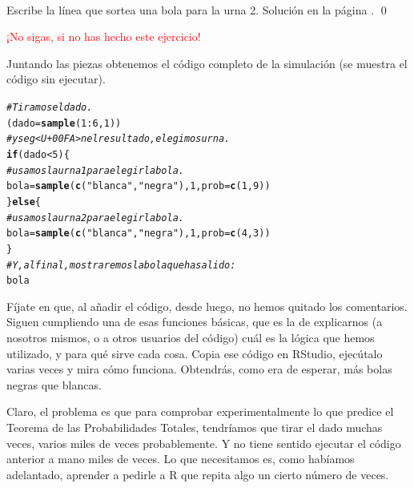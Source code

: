 \documentclass[10pt,a4paper]{article}\usepackage[]{graphicx}\usepackage[]{color}
\makeatletter
\newcommand{\hlnum}[1]{\textcolor[rgb]{0.686,0.059,0.569}{#1}}%
\newcommand{\hlstr}[1]{\textcolor[rgb]{0.192,0.494,0.8}{#1}}%
\newcommand{\hlcom}[1]{\textcolor[rgb]{0.678,0.584,0.686}{\textit{#1}}}%
\newcommand{\hlopt}[1]{\textcolor[rgb]{0,0,0}{#1}}%
\newcommand{\hlstd}[1]{\textcolor[rgb]{0.345,0.345,0.345}{#1}}%
\newcommand{\hlkwa}[1]{\textcolor[rgb]{0.161,0.373,0.58}{\textbf{#1}}}%
\newcommand{\hlkwb}[1]{\textcolor[rgb]{0.69,0.353,0.396}{#1}}%
\newcommand{\hlkwc}[1]{\textcolor[rgb]{0.333,0.667,0.333}{#1}}%
\newcommand{\hlkwd}[1]{\textcolor[rgb]{0.737,0.353,0.396}{\textbf{#1}}}%
\newenvironment{kframe}{%
 \def\at@end@of@kframe{}%
 \ifinner\ifhmode%
  \def\at@end@of@kframe{\end{minipage}}%
  \begin{minipage}{\columnwidth}%
 \fi\fi%
 \def\FrameCommand##1{\hskip\@totalleftmargin \hskip-\fboxsep
 \colorbox{shadecolor}{##1}\hskip-\fboxsep
     \hskip-\linewidth \hskip-\@totalleftmargin \hskip\columnwidth}%
 \MakeFramed {\advance\hsize-\width
   \@totalleftmargin\z@ \linewidth\hsize
   \@setminipage}}%
 {\par\unskip\endMakeFramed%
 \at@end@of@kframe}
\newenvironment{knitrout}{}{} %
\makeatother
\begin{document}
\begin{ejercicio}
\label{tut04:ejercicio08}
\quad\\
Escribe la línea que sortea una bola para la urna 2.
Solución en la página \pageref{tut04:ejercicio08:sol}.
\qed
\end{ejercicio}

\vspace{3cm}

\textcolor{red}{\Huge ¡No sigas, si no has hecho este ejercicio!}

\newpage
Juntando las piezas obtenemos el código completo de la simulación (se muestra el código sin ejecutar).

\begin{knitrout}
\color{fgcolor}\begin{kframe}
\begin{alltt}
\hlcom{# Tiramos el dado.}
\hlstd{(dado} \hlkwb{=} \hlkwd{sample}\hlstd{(}\hlnum{1}\hlopt{:}\hlnum{6}\hlstd{,}\hlnum{1}\hlstd{))}
\hlcom{# y seg<U+00FA>n el resultado, elegimos urna.}
\hlkwa{if}\hlstd{(dado} \hlopt{<} \hlnum{5}\hlstd{)\{}
  \hlcom{# usamos la urna 1 para elegir la bola.}
  \hlstd{bola} \hlkwb{=} \hlkwd{sample}\hlstd{(} \hlkwd{c}\hlstd{(}\hlstr{"blanca"}\hlstd{,}\hlstr{"negra"}\hlstd{),} \hlnum{1}\hlstd{,} \hlkwc{prob}\hlstd{=}\hlkwd{c}\hlstd{(}\hlnum{1}\hlstd{,}\hlnum{9}\hlstd{) )}
\hlstd{\}} \hlkwa{else} \hlstd{\{}
  \hlcom{# usamos la urna 2 para elegir la bola.}
  \hlstd{bola} \hlkwb{=} \hlkwd{sample}\hlstd{(} \hlkwd{c}\hlstd{(}\hlstr{"blanca"}\hlstd{,}\hlstr{"negra"}\hlstd{),} \hlnum{1}\hlstd{,} \hlkwc{prob}\hlstd{=}\hlkwd{c}\hlstd{(}\hlnum{4}\hlstd{,}\hlnum{3}\hlstd{) )}
\hlstd{\}}
\hlcom{# Y, al final, mostraremos la bola que ha salido:}
\hlstd{bola}
\end{alltt}
\end{kframe}
\end{knitrout}

Fíjate en que, al añadir el código, desde luego, no hemos quitado los comentarios. Siguen cumpliendo una de esas funciones básicas, que es la de explicarnos (a nosotros mismos, o a otros usuarios del código) cuál es la lógica que hemos utilizado, y para qué sirve cada cosa. Copia ese código en RStudio, ejecútalo varias veces y mira cómo funciona. Obtendrás, como era de esperar, más bolas negras que blancas.

Claro, el problema es que para comprobar experimentalmente lo que predice el Teorema de las Probabilidades Totales, tendríamos que tirar el dado muchas veces, varios miles de veces probablemente. Y no tiene sentido ejecutar el código anterior a mano miles de veces. Lo que necesitamos es, como habíamos adelantado, aprender a pedirle a R que repita algo un cierto número de veces.
\end{document}
